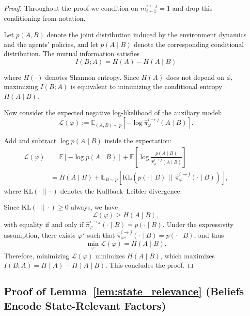 \documentclass{article}
\theoremstyle{plain}
\theoremstyle{definition}
\theoremstyle{remark}
\begin{document}
\begin{proof}
Throughout the proof we condition on $m_{t+1}^{i \leftarrow j} = 1$ and drop this conditioning from notation.

Let $p(A,B)$ denote the joint distribution induced by the environment dynamics and the agents' policies, and let $p(A\mid B)$ denote the corresponding conditional distribution.
The mutual information satisfies
\begin{equation}
    I(B;A) = H(A) - H(A \mid B)
\end{equation}


where $H(\cdot)$ denotes Shannon entropy.
Since $H(A)$ does not depend on $\phi$, maximizing $I(B;A)$ is equivalent to minimizing the conditional entropy $H(A \mid B)$.

Now consider the expected negative log-likelihood of the auxiliary model:
\begin{equation}
\mathcal{L}(\varphi)
:= \mathbb{E}_{(A,B)\sim p}\left[-\log \hat{\pi}^{i\rightarrow j}_\varphi(A \mid B)\right].
\end{equation}

Add and subtract $\log p(A\mid B)$ inside the expectation:
\begin{align*}
\mathcal{L}(\varphi)
&= \mathbb{E}\left[-\log p(A\mid B)\right]
  + \mathbb{E}\left[\log \frac{p(A\mid B)}{\hat{\pi}^{i\rightarrow j}_\varphi(A\mid B)}\right] \\
&= H(A\mid B) + \mathbb{E}_{B\sim p}\left[ \mathrm{KL}\!\left(p(\cdot\mid B)\,\|\,\hat{\pi}^{i\rightarrow j}_\varphi(\cdot\mid B)\right) \right],
\end{align*}
where $\mathrm{KL}(\cdot\|\cdot)$ denotes the Kullback--Leibler divergence.

Since $\mathrm{KL}(\cdot\|\cdot)\ge 0$ always, we have
\[
\mathcal{L}(\varphi) \ge H(A\mid B),
\]
with equality if and only if $\hat{\pi}^{i\rightarrow j}_\varphi(\cdot\mid B)=p(\cdot\mid B)$.
Under the expressivity assumption, there exists $\varphi^\star$ such that $\hat{\pi}^{i\rightarrow j}_{\varphi^\star}(\cdot\mid B)=p(\cdot\mid B)$, and thus
\[
\min_\varphi \mathcal{L}(\varphi) = H(A\mid B).
\]
Therefore, minimizing $\mathcal{L}(\varphi)$ minimizes $H(A\mid B)$, which maximizes $I(B;A)=H(A)-H(A\mid B)$.
This concludes the proof.
\end{proof}

\subsection{Proof of Lemma~\ref{lem:state_relevance} (Beliefs Encode State-Relevant Factors)}
\label{app:proof_lemma2}
\end{document}
